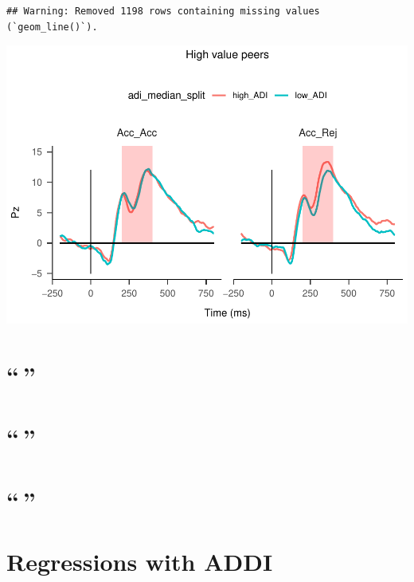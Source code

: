 \documentclass[
]{article}
\begin{document}
\begin{verbatim}
## Warning: Removed 1198 rows containing missing values (`geom_line()`).
\end{verbatim}

\includegraphics{do01_BUDS_files/figure-latex/unnamed-chunk-26-3.pdf}

\hypertarget{section}{%
\section{``\,''}\label{section}}

\hypertarget{section-1}{%
\section{``\,''}\label{section-1}}

\hypertarget{section-2}{%
\section{``\,''}\label{section-2}}

\hypertarget{regressions-with-addi}{%
\section{Regressions with ADDI}\label{regressions-with-addi}}
\end{document}
